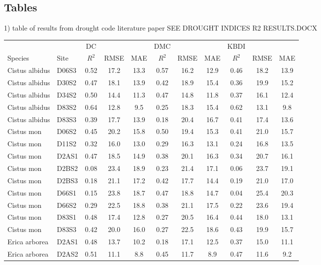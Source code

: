 \documentclass[twocolumn,10pt]{article}
\begin{document}
\subsection{Tables}
1) table of results from drought code literature paper SEE DROUGHT INDICES R2 RESULTS.DOCX \\
\begin{table}[H]
\begin{tabular}{llccccccccc}
       &      &   DC    & &     &    DMC  & &     &    KBDI & & \\
Species & Site & $R^2$ & RMSE & MAE & $R^2$ & RMSE & MAE & $R^2$ & RMSE & MAE \\
Cistus albidus & D06S3 & 0.52 & 17.2 & 13.3 & 0.57 & 16.2 & 12.9 & 0.46 & 18.2 & 13.9 \\
Cistus albidus & D30S2 & 0.47 & 18.1 & 13.9 & 0.42 & 18.9 & 15.4 & 0.36 & 19.9 & 15.2 \\
Cistus albidus & D34S2 & 0.50 & 14.4 & 11.3 & 0.47 & 14.8 & 11.8 & 0.37 & 16.1 & 12.4 \\
Cistus albidus & D83S2 & 0.64 & 12.8 & 9.5 & 0.25 & 18.3 & 15.4 & 0.62 & 13.1 & 9.8 \\
Cistus albidus & D83S3 & 0.39 & 17.7 & 13.9 & 0.18 & 20.4 & 16.7 & 0.41 & 17.4 & 13.6 \\
Cistus mon & D06S2 & 0.45 & 20.2 & 15.8 & 0.50 & 19.4 & 15.3 & 0.41 & 21.0 & 15.7 \\
Cistus mon & D11S2 & 0.32 & 16.0 & 13.0 & 0.29 & 16.3 & 13.1 & 0.24 & 16.8 & 13.5 \\
Cistus mon & D2AS1 & 0.47 & 18.5 & 14.9 & 0.38 & 20.1 & 16.3 & 0.34 & 20.7 & 16.1 \\
Cistus mon & D2BS2 & 0.08 & 23.4 & 18.9 & 0.23 & 21.4 & 17.1 & 0.06 & 23.7 & 19.1 \\
Cistus mon & D2BS3 & 0.18 & 21.1 & 17.2 & 0.42 & 17.7 & 14.4 & 0.19 & 21.0 & 17.0 \\
Cistus mon & D66S1 & 0.15 & 23.8 & 18.7 & 0.47 & 18.8 & 14.7 & 0.04 & 25.4 & 20.3 \\
Cistus mon & D66S2 & 0.29 & 22.5 & 18.8 & 0.38 & 21.1 & 17.5 & 0.22 & 23.6 & 19.4 \\
Cistus mon & D83S1 & 0.48 & 17.4 & 12.8 & 0.27 & 20.5 & 16.4 & 0.44 & 18.0 & 13.1 \\
Cistus mon & D83S3 & 0.42 & 20.0 & 16.0 & 0.27 & 22.5 & 18.6 & 0.43 & 19.9 & 15.7 \\
Erica arborea & D2AS1 & 0.48 & 13.7 & 10.2 & 0.18 & 17.1 & 12.5 & 0.37 & 15.0 & 11.1 \\
Erica arborea & D2AS2 & 0.51 & 11.1 & 8.8 & 0.45 & 11.7 & 8.9 & 0.47 & 11.6 & 9.2 \\

\end{tabular}
\end{table}
\end{document}
